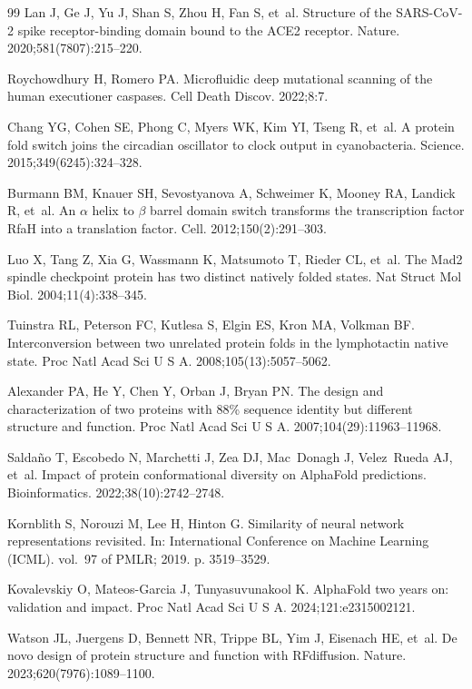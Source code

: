\documentclass[10pt,a4paper]{article}
\begin{document}
\begin{thebibliography}{99}
Lan J, Ge J, Yu J, Shan S, Zhou H, Fan S, et~al.
\newblock Structure of the SARS-CoV-2 spike receptor-binding domain bound to the ACE2 receptor.
\newblock Nature. 2020;581(7807):215--220.

Roychowdhury H, Romero PA.
\newblock Microfluidic deep mutational scanning of the human executioner caspases.
\newblock Cell Death Discov. 2022;8:7.

Chang YG, Cohen SE, Phong C, Myers WK, Kim YI, Tseng R, et~al.
\newblock A protein fold switch joins the circadian oscillator to clock output in cyanobacteria.
\newblock Science. 2015;349(6245):324--328.

Burmann BM, Knauer SH, Sevostyanova A, Schweimer K, Mooney RA, Landick R, et~al.
\newblock An $\alpha$ helix to $\beta$ barrel domain switch transforms the transcription factor RfaH into a translation factor.
\newblock Cell. 2012;150(2):291--303.

Luo X, Tang Z, Xia G, Wassmann K, Matsumoto T, Rieder CL, et~al.
\newblock The Mad2 spindle checkpoint protein has two distinct natively folded states.
\newblock Nat Struct Mol Biol. 2004;11(4):338--345.

Tuinstra RL, Peterson FC, Kutlesa S, Elgin ES, Kron MA, Volkman BF.
\newblock Interconversion between two unrelated protein folds in the lymphotactin native state.
\newblock Proc Natl Acad Sci U S A. 2008;105(13):5057--5062.

Alexander PA, He Y, Chen Y, Orban J, Bryan PN.
\newblock The design and characterization of two proteins with 88\% sequence identity but different structure and function.
\newblock Proc Natl Acad Sci U S A. 2007;104(29):11963--11968.

Salda{\~n}o T, Escobedo N, Marchetti J, Zea DJ, Mac~Donagh J, Velez~Rueda AJ, et~al.
\newblock Impact of protein conformational diversity on AlphaFold predictions.
\newblock Bioinformatics. 2022;38(10):2742--2748.

Kornblith S, Norouzi M, Lee H, Hinton G.
\newblock Similarity of neural network representations revisited.
\newblock In: International Conference on Machine Learning (ICML). vol.~97 of PMLR; 2019. p. 3519--3529.

Kovalevskiy O, Mateos-Garcia J, Tunyasuvunakool K.
\newblock AlphaFold two years on: validation and impact.
\newblock Proc Natl Acad Sci U S A. 2024;121:e2315002121.

Watson JL, Juergens D, Bennett NR, Trippe BL, Yim J, Eisenach HE, et~al.
\newblock De novo design of protein structure and function with RFdiffusion.
\newblock Nature. 2023;620(7976):1089--1100.

\end{thebibliography}

\newpage

\end{document}
